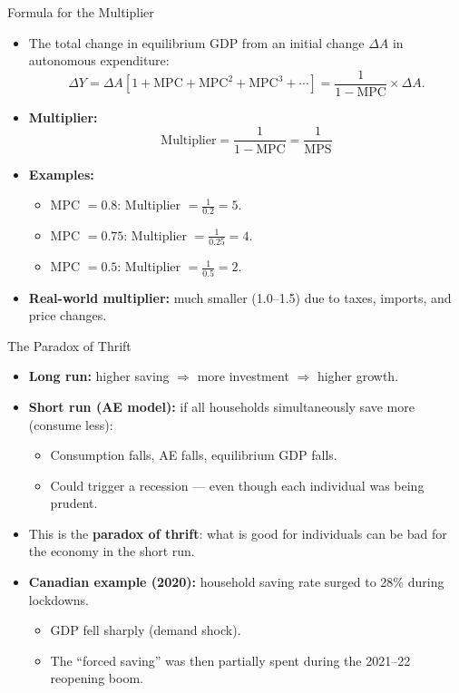 \documentclass[aspectratio=169]{beamer}
\begin{document}
\begin{frame}{Formula for the Multiplier}
\transfade
\begin{itemize}[<+->]
  \item The total change in equilibrium GDP from an initial change $\Delta A$ in autonomous expenditure:
  \[
    \Delta Y = \Delta A \left[1 + \text{MPC} + \text{MPC}^2 + \text{MPC}^3 + \cdots \right]
            = \frac{1}{1 - \text{MPC}} \times \Delta A.
  \]
  \item \textbf{Multiplier:}
  \[
    \boxed{\text{Multiplier} = \frac{1}{1 - \text{MPC}} = \frac{1}{\text{MPS}}}
  \]
  \item \textbf{Examples:}
  \begin{itemize}[<+->]
    \item MPC $= 0.8$: Multiplier $= \frac{1}{0.2} = 5$.
    \item MPC $= 0.75$: Multiplier $= \frac{1}{0.25} = 4$.
    \item MPC $= 0.5$: Multiplier $= \frac{1}{0.5} = 2$.
  \end{itemize}
  \item \textbf{Real-world multiplier:} much smaller (1.0--1.5) due to taxes, imports, and price changes.
\end{itemize}
\end{frame}

\begin{frame}{The Paradox of Thrift}
\transfade
\begin{itemize}[<+->]
  \item \textbf{Long run:} higher saving $\Rightarrow$ more investment $\Rightarrow$ higher growth.
  \item \textbf{Short run (AE model):} if all households simultaneously save more (consume less):
  \begin{itemize}[<+->]
    \item Consumption falls, AE falls, equilibrium GDP falls.
    \item Could trigger a recession --- even though each individual was being prudent.
  \end{itemize}
  \item This is the \textbf{paradox of thrift}: what is good for individuals can be bad for the economy in the short run.
  \item \textbf{Canadian example (2020):} household saving rate surged to \alert{28\%} during lockdowns.
  \begin{itemize}[<+->]
    \item GDP fell sharply (demand shock).
    \item The ``forced saving'' was then partially spent during the 2021--22 reopening boom.
  \end{itemize}
\end{itemize}
\end{frame}
\end{document}
